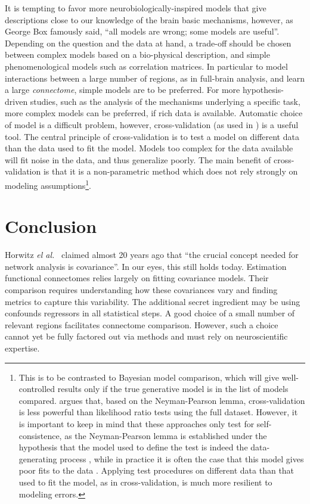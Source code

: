 \documentclass[5p]{elsarticle}
\begin{document}
It is tempting to favor more neurobiologically-inspired models that give
descriptions close to our knowledge of the brain basic mechanisms,
however, as George Box famously said, ``all models are wrong; some models
are useful''. Depending on the question and the data at hand, a trade-off 
should be chosen between complex models based on a bio-physical description,
and simple phenomenological models such as correlation matrices. In
particular to model interactions between a large number of regions, as in
full-brain analysis, and learn a large \emph{connectome}, simple models
are to be preferred. For more hypothesis-driven studies, such as the
analysis of the mechanisms underlying a specific task, more complex models
can be preferred, if rich data is available. Automatic choice of model is
a difficult problem, however, cross-validation (as used in
\cite{varoquaux2010c,craddock2012,strother2006}) is a useful tool. The
central principle of cross-validation is to test a model on different
data than the data used to fit the model. Models too complex
for the data available will fit noise in the data, and thus generalize
poorly. The main benefit of cross-validation is that it is a
non-parametric method which does not rely strongly on modeling
assumptions\footnote{This is to be contrasted to Bayesian model
comparison, which will give well-controlled results only if the true generative
model is in the list of models compared. \cite{friston2012} argues that,
based on the Neyman-Pearson lemma, cross-validation is less powerful than
likelihood ratio tests using the full dataset. However, it is
important to keep in mind that these approaches only test for
self-consistence, as the Neyman-Pearson lemma is established under the
hypothesis that the model used to define the test is indeed the 
data-generating process
\cite{neyman1933}, while in practice it is often the case that this model
gives poor fits to the data \cite{lohmann2012}. Applying test procedures
on different data than that used to fit the model, as in
cross-validation, is much more resilient to modeling errors.}.



\section{Conclusion}

Horwitz \emph{el al.}\ \cite{horwitz1995} claimed almost 20 years ago
that ``the crucial concept needed for network analysis is covariance''.
In our eyes, this still holds today. Estimation functional connectomes
relies largely on fitting covariance models. Their comparison requires
understanding how these covariances vary and finding metrics to capture
this variability. The additional secret ingredient may be using  
confounds regressors in all statistical steps. A good choice of a small number of
relevant regions facilitates connectome comparison. However, such a
choice cannot yet be fully factored out via methods and must rely on
neuroscientific expertise.
\end{document}

